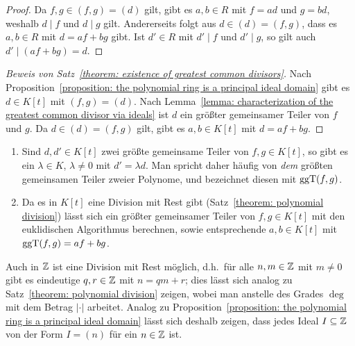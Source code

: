 \begin{proof}
  Da $f, g \in (f,g) = (d)$ gilt, gibt es $a, b \in R$ mit $f = ad$ und $g = bd$, weshalb $d \mid f$ und $d \mid g$ gilt.
  Andererseits folgt aus $d \in (d) = (f,g)$, dass es $a, b \in R$ mit $d = af + bg$ gibt.
  Ist $d' \in R$ mit $d' \mid f$ und $d' \mid g$, so gilt auch $d' \mid (af + bg) = d$.
\end{proof}


\begin{proof}[Beweis von Satz~\ref{theorem: existence of greatest common divisors}]
  Nach Proposition~\ref{proposition: the polynomial ring is a principal ideal domain} gibt es $d \in K[t]$ mit $(f,g) = (d)$.
  Nach Lemma~\ref{lemma: characterization of the greatest common divisor via ideals} ist $d$ ein größter gemeinsamer Teiler von $f$ und $g$.
  Da $d \in (d) = (f,g)$ gilt, gibt es $a, b \in K[t]$ mit $d = af + bg$.
\end{proof}


\begin{remark}
  \begin{enumerate}
    \item
      Sind $d, d' \in K[t]$ zwei größte gemeinsame Teiler von $f, g \in K[t]$, so gibt es ein $\lambda \in K$, $\lambda \neq 0$ mit $d' = \lambda d$.
      Man spricht daher häufig von \emph{dem} größten gemeinsamen Teiler zweier Polynome, und bezeichnet diesen mit $\operatorname{ggT}(f,g)$.
    \item
      Da es in $K[t]$ eine Division mit Rest gibt (Satz~\ref{theorem: polynomial division}) lässt sich ein größter gemeinsamer Teiler von $f, g \in K[t]$ mit den euklidischen Algorithmus berechnen, sowie entsprechende $a, b \in K[t]$ mit $\operatorname{ggT}(f,g) = af + bg$.
  \end{enumerate}
\end{remark}


\begin{remark}
  Auch in $\mathbb{Z}$ ist eine Division mit Rest möglich, d.h.\ für alle $n, m \in \mathbb{Z}$ mit $m \neq 0$ gibt es eindeutige $q, r \in \mathbb{Z}$ mit $n = qm + r$;
  dies lässt sich analog zu Satz~\ref{theorem: polynomial division} zeigen, wobei man anstelle des Grades $\deg$ mit dem Betrag $|\cdot|$ arbeitet.
  Analog zu Proposition~\ref{proposition: the polynomial ring is a principal ideal domain} lässt sich deshalb zeigen, dass jedes Ideal $I \subseteq \mathbb{Z}$ von der Form $I = (n)$ für ein $n \in \mathbb{Z}$ ist.
\end{remark}









